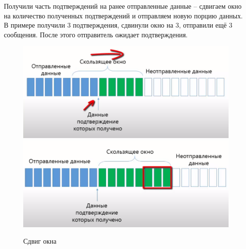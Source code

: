 Получили часть подтверждений на ранее отправленные данные -- сдвигаем окно на количество полученных подтверждений и отправляем новую порцию данных. В примере получили 3 подтверждения, сдвинули окно на 3, отправили ещё 3 сообщения. После этого отправитель ожидает подтверждения.

\begin{figure}[H] \centering
	\includegraphics[scale = 0.4]{18/window_2.png}
	\includegraphics[scale = 0.4]{18/window_3.png}
	\caption{Сдвиг окна}
\end{figure}


